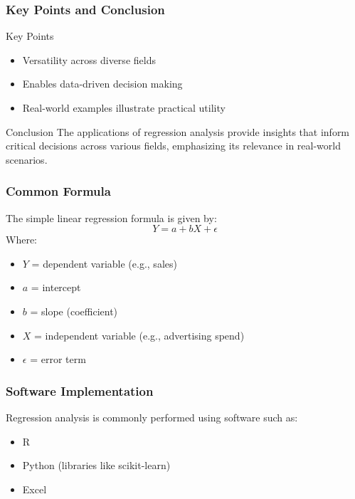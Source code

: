 \documentclass{beamer}
\begin{document}
\begin{frame}[fragile]
    \frametitle{Key Points and Conclusion}
    \begin{block}{Key Points}
        \begin{itemize}
            \item Versatility across diverse fields
            \item Enables data-driven decision making
            \item Real-world examples illustrate practical utility
        \end{itemize}
    \end{block}

    \begin{block}{Conclusion}
        The applications of regression analysis provide insights that inform critical decisions across various fields, emphasizing its relevance in real-world scenarios.
    \end{block}
\end{frame}

\begin{frame}[fragile]
    \frametitle{Common Formula}
    The simple linear regression formula is given by:
    \begin{equation}
        Y = a + bX + \epsilon
    \end{equation}
    Where:
    \begin{itemize}
        \item $Y$ = dependent variable (e.g., sales)
        \item $a$ = intercept
        \item $b$ = slope (coefficient)
        \item $X$ = independent variable (e.g., advertising spend)
        \item $\epsilon$ = error term
    \end{itemize}
\end{frame}

\begin{frame}[fragile]
    \frametitle{Software Implementation}
    Regression analysis is commonly performed using software such as:
    \begin{itemize}
        \item R
        \item Python (libraries like scikit-learn)
        \item Excel
    \end{itemize}
\end{frame}
\end{document}

